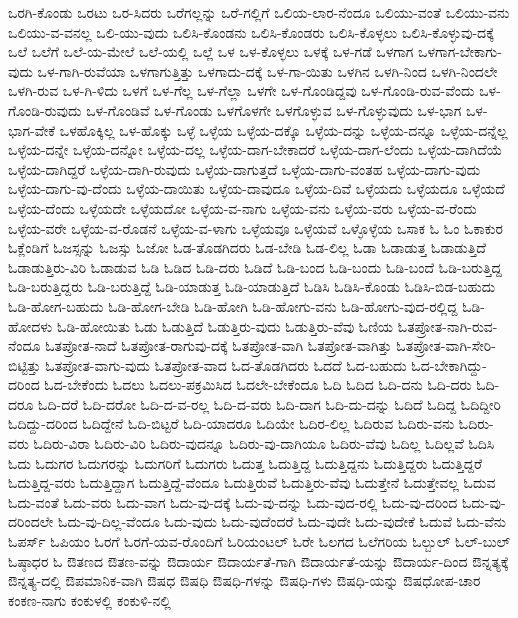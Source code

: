 {ಒರಗಿ-ಕೊಂಡು
ಒರಟು
ಒರ-ಸಿದರು
ಒರೆಗಲ್ಲನ್ನು
ಒರೆ-ಗಲ್ಲಿಗೆ
ಒಲಿಯ-ಲಾರ-ನೆಂದೂ
ಒಲಿಯು-ವಂತೆ
ಒಲಿಯು-ವನು
ಒಲಿಯು-ವ-ವನಲ್ಲ
ಒಲಿ-ಯು-ವುದು
ಒಲಿಸಿ-ಕೊಂಡನು
ಒಲಿಸಿ-ಕೊಂಡರು
ಒಲಿಸಿ-ಕೊಳ್ಳಲು
ಒಲಿಸಿ-ಕೊಳ್ಳುವು-ದಕ್ಕೆ
ಒಲೆ
ಒಲೆಗೆ
ಒಲೆ-ಯ-ಮೇಲೆ
ಒಲೆ-ಯಲ್ಲಿ
ಒಲ್ಲೆ
ಒಳ
ಒಳ-ಕೊಳ್ಳಲು
ಒಳಕ್ಕೆ
ಒಳ-ಗಡೆ
ಒಳಗಾಗ
ಒಳಗಾಗ-ಬೇಕಾಗು-ವುದು
ಒಳ-ಗಾಗಿ-ರುವೆಯಾ
ಒಳಗಾಗುತ್ತಿತ್ತು
ಒಳಗಾದು-ದಕ್ಕೆ
ಒಳ-ಗಾ-ಯಿತು
ಒಳಗಿನ
ಒಳಗಿ-ನಿಂದ
ಒಳಗಿ-ನಿಂದಲೇ
ಒಳಗಿ-ರುವ
ಒಳ-ಗಿ-ಳಿದು
ಒಳಗೆ
ಒಳ-ಗೆಲ್ಲ
ಒಳ-ಗೆಲ್ಲಾ
ಒಳಗೇ
ಒಳ-ಗೊಂಡಿದ್ದವು
ಒಳ-ಗೊಂಡಿ-ರುವ-ವೆಂದು
ಒಳ-ಗೊಂಡಿ-ರುವುದು
ಒಳ-ಗೊಂಡಿವೆ
ಒಳ-ಗೊಂಡು
ಒಳಗೊಳಗೇ
ಒಳಗೊಳ್ಳುವ
ಒಳ-ಗೊಳ್ಳುವುದು
ಒಳ-ಭಾಗ
ಒಳ-ಭಾಗ-ವೇಕೆ
ಒಳಹೊಕ್ಕಿಲ್ಲ
ಒಳ-ಹೊಕ್ಕು
ಒಳ್ಳೆ
ಒಳ್ಳೆಯ
ಒಳ್ಳೆಯ-ದಕ್ಕೊ
ಒಳ್ಳೆಯ-ದನ್ನು
ಒಳ್ಳೆಯ-ದನ್ನೂ
ಒಳ್ಳೆಯ-ದನ್ನೆಲ್ಲ
ಒಳ್ಳೆಯ-ದನ್ನೇ
ಒಳ್ಳೆಯ-ದನ್ನೋ
ಒಳ್ಳೆಯ-ದಲ್ಲ
ಒಳ್ಳೆಯ-ದಾಗ-ಬೇಕಾದರೆ
ಒಳ್ಳೆಯ-ದಾಗ-ಲೆಂದು
ಒಳ್ಳೆಯ-ದಾಗಿದೆಯೆ
ಒಳ್ಳೆಯ-ದಾಗಿದ್ದರೆ
ಒಳ್ಳೆಯ-ದಾಗಿ-ರುವುದು
ಒಳ್ಳೆಯ-ದಾಗುತ್ತದೆ
ಒಳ್ಳೆಯ-ದಾಗು-ವಂತಹ
ಒಳ್ಳೆಯ-ದಾಗು-ವುದು
ಒಳ್ಳೆಯ-ದಾಗು-ವು-ದೆಂದು
ಒಳ್ಳೆಯ-ದಾಯಿತು
ಒಳ್ಳೆಯ-ದಾವುದೂ
ಒಳ್ಳೆಯ-ದಿವೆ
ಒಳ್ಳೆಯದು
ಒಳ್ಳೆಯದೂ
ಒಳ್ಳೆಯದೆ
ಒಳ್ಳೆಯ-ದೆಂದು
ಒಳ್ಳೆಯದೇ
ಒಳ್ಳೆಯದೋ
ಒಳ್ಳೆಯ-ವ-ನಾಗು
ಒಳ್ಳೆಯ-ವನು
ಒಳ್ಳೆಯ-ವರು
ಒಳ್ಳೆಯ-ವ-ರೆಂದು
ಒಳ್ಳೆಯ-ವರೇ
ಒಳ್ಳೆಯ-ವ-ರೊಡನೆ
ಒಳ್ಳೆಯ-ವ-ಳಾಗು
ಒಳ್ಳೆಯವೂ
ಒಳ್ಳೆಯವೆ
ಒಳ್ಳೊಳ್ಳೆಯ
ಒಸಾಕ
ಓ
ಓಂ
ಓಕಾಕುರ
ಓಕ್ಲೆಂಡಿಗೆ
ಓಜಸ್ಸನ್ನು
ಓಜಸ್ಸು
ಓಜೋ
ಓಡ-ತೊಡಗಿದರು
ಓಡ-ಬೇಡಿ
ಓಡ-ಲಿಲ್ಲ
ಓಡಾ
ಓಡಾಡುತ್ತ
ಓಡಾಡುತ್ತಿದೆ
ಓಡಾಡುತ್ತಿರು-ವಿರಿ
ಓಡಾಡುವ
ಓಡಿ
ಓಡಿದ
ಓಡಿ-ದರು
ಓಡಿದೆ
ಓಡಿ-ಬಂದ
ಓಡಿ-ಬಂದು
ಓಡಿ-ಬಂದೆ
ಓಡಿ-ಬರುತ್ತಿದ್ದ
ಓಡಿ-ಬರುತ್ತಿದ್ದರು
ಓಡಿ-ಬರುತ್ತಿದ್ದೆ
ಓಡಿ-ಯಾಡುತ್ತ
ಓಡಿ-ಯಾಡುತ್ತಿದೆ
ಓಡಿಸಿ
ಓಡಿಸಿ-ಕೊಂಡು
ಓಡಿಸಿ-ಬಿಡ-ಬಹುದು
ಓಡಿ-ಹೋಗ-ಬಹುದು
ಓಡಿ-ಹೋಗ-ಬೇಡಿ
ಓಡಿ-ಹೋಗಿ
ಓಡಿ-ಹೋಗು-ವನು
ಓಡಿ-ಹೋಗು-ವುದ-ರಲ್ಲಿದ್ದ
ಓಡಿ-ಹೋದಳು
ಓಡಿ-ಹೋಯಿತು
ಓಡು
ಓಡುತ್ತಿದೆ
ಓಡುತ್ತಿರು-ವುದು
ಓಡುತ್ತಿರು-ವೆವು
ಓಣಿಯ
ಓತಪ್ರೋತ-ನಾಗಿ-ರುವ-ನೆಂದೂ
ಓತಪ್ರೋತ-ನಾದೆ
ಓತಪ್ರೋತ-ರಾಗುವು-ದಕ್ಕೆ
ಓತಪ್ರೋತ-ವಾಗಿ
ಓತಪ್ರೋತ-ವಾಗಿತ್ತು
ಓತಪ್ರೋತ-ವಾಗಿ-ಸೇರಿ-ಬಿಟ್ಟಿತ್ತು
ಓತಪ್ರೋತ-ವಾಗು-ವುದು
ಓತಪ್ರೋತ-ವಾದ
ಓದ-ತೊಡಗಿದರು
ಓದದೆ
ಓದ-ಬಹುದು
ಓದ-ಬೇಕಾಗಿದ್ದು-ದರಿಂದ
ಓದ-ಬೇಕೆಂದು
ಓದಲು
ಓದಲು-ಪಕ್ರಮಿಸಿದ
ಓದಲೇ-ಬೇಕೆಂದೂ
ಓದಿ
ಓದಿದ
ಓದಿ-ದನು
ಓದಿ-ದರು
ಓದಿ-ದರೂ
ಓದಿ-ದರೆ
ಓದಿ-ದರೋ
ಓದಿ-ದ-ವ-ರಲ್ಲ
ಓದಿ-ದ-ವರು
ಓದಿ-ದಾಗ
ಓದಿ-ದು-ದನ್ನು
ಓದಿದೆ
ಓದಿದ್ದ
ಓದಿದ್ದೀರಿ
ಓದಿದ್ದು-ದರಿಂದ
ಓದಿದ್ದೇನೆ
ಓದಿ-ಬಿಟ್ಟರೆ
ಓದಿ-ಯಾದರೂ
ಓದಿಯೇ
ಓದಿರ-ಲಿಲ್ಲ
ಓದಿರುವ
ಓದಿರು-ವನು
ಓದಿರು-ವರು
ಓದಿರು-ವಿರಾ
ಓದಿರು-ವಿರಿ
ಓದಿರು-ವುದನ್ನೂ
ಓದಿರು-ವು-ದಾಗಿಯೂ
ಓದಿರು-ವೆವು
ಓದಿಲ್ಲ
ಓದಿಲ್ಲವೆ
ಓದಿಸಿ
ಓದು
ಓದುಗರ
ಓದುಗರನ್ನು
ಓದುಗರಿಗೆ
ಓದುಗರು
ಓದುತ್ತ
ಓದುತ್ತಿದ್ದ
ಓದುತ್ತಿದ್ದನು
ಓದುತ್ತಿದ್ದರು
ಓದುತ್ತಿದ್ದರೆ
ಓದುತ್ತಿದ್ದ-ವರು
ಓದುತ್ತಿದ್ದಾಗ
ಓದುತ್ತಿದ್ದೆ-ವೆಂದೂ
ಓದುತ್ತಿರುವೆ
ಓದುತ್ತಿರು-ವೆವು
ಓದುತ್ತೇನೆ
ಓದುತ್ತೇವಲ್ಲ
ಓದುವ
ಓದು-ವಂತೆ
ಓದು-ವರು
ಓದು-ವಾಗ
ಓದು-ವು-ದಕ್ಕೆ
ಓದು-ವು-ದನ್ನು
ಓದು-ವುದ-ರಲ್ಲಿ
ಓದು-ವು-ದರಿಂದ
ಓದು-ವು-ದರಿಂದಲೇ
ಓದು-ವು-ದಿಲ್ಲ-ವೆಂದೂ
ಓದು-ವುದು
ಓದು-ವುದೆಂದರೆ
ಓದು-ವುದೇ
ಓದು-ವುದೇಕೆ
ಓದುವೆ
ಓದು-ವೆನು
ಓಪರ್ಸ್
ಓಪಿಯಂ
ಓರಗೆ
ಓರಗೆ-ಯವ-ರೊಂದಿಗೆ
ಓರಿಯಂಟಲ್
ಓರೇ
ಓಲಗದ
ಓಲೆಗರಿಯ
ಓಲ್ಬುಲ್
ಓಲ್-ಬುಲ್
ಓಷ್ಠಾಧರ
ಓ
ಔತಣದ
ಔತಣ-ವನ್ನು
ಔದಾರ್ಯ
ಔದಾರ್ಯತೆ-ಗಾಗಿ
ಔದಾರ್ಯತೆ-ಯನ್ನು
ಔದಾರ್ಯ-ದಿಂದ
ಔನ್ನತ್ಯಕ್ಕೆ
ಔನ್ನತ್ಯ-ದಲ್ಲಿ
ಔಪಮಾನಿಕ-ವಾಗಿ
ಔಷಧ
ಔಷಧಿ
ಔಷಧಿ-ಗಳನ್ನು
ಔಷಧಿ-ಗಳು
ಔಷಧಿ-ಯನ್ನು
ಔಷಧೋಪ-ಚಾರ
ಕಂಕಣ-ನಾಗು
ಕಂಕುಳಲ್ಲಿ
ಕಂಕುಳಿ-ನಲ್ಲಿ
}
